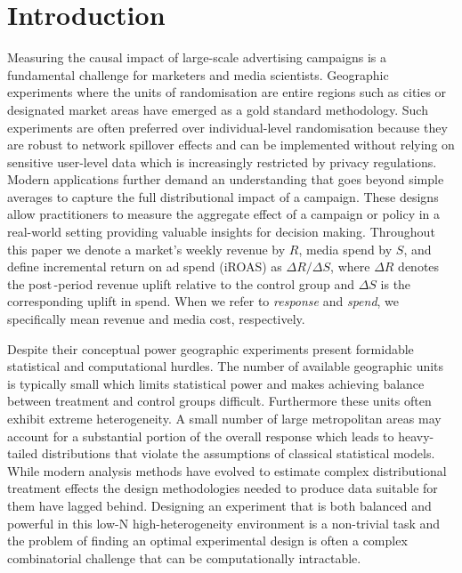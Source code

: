 \documentclass[final,3p,fleqn, 10pt]{elsarticle}
\begin{document}
\section{Introduction}
\label{sec:introduction}
Measuring the causal impact of large-scale advertising campaigns is a fundamental challenge for marketers and media scientists. Geographic experiments where the units of randomisation are entire regions such as cities or designated market areas have emerged as a gold standard methodology. Such experiments are often preferred over individual-level randomisation because they are robust to network spillover effects and can be implemented without relying on sensitive user-level data which is increasingly restricted by privacy regulations. Modern applications further demand an understanding that goes beyond simple averages to capture the full distributional impact of a campaign. These designs allow practitioners to measure the aggregate effect of a campaign or policy in a real-world setting providing valuable insights for decision making. Throughout this paper we denote a market's weekly revenue by $R$, media spend by $S$, and define incremental return on ad spend (iROAS) as $\Delta R / \Delta S$, where $\Delta R$ denotes the post\,-period revenue uplift relative to the control group and $\Delta S$ is the corresponding uplift in spend. When we refer to \emph{response} and \emph{spend}, we specifically mean revenue and media cost, respectively.

Despite their conceptual power geographic experiments present formidable statistical and computational hurdles. The number of available geographic units is typically small which limits statistical power and makes achieving balance between treatment and control groups difficult. Furthermore these units often exhibit extreme heterogeneity. A small number of large metropolitan areas may account for a substantial portion of the overall response which leads to heavy-tailed distributions that violate the assumptions of classical statistical models. While modern analysis methods have evolved to estimate complex distributional treatment effects the design methodologies needed to produce data suitable for them have lagged behind. Designing an experiment that is both balanced and powerful in this low-N high-heterogeneity environment is a non-trivial task and the problem of finding an optimal experimental design is often a complex combinatorial challenge that can be computationally intractable.
\end{document}

